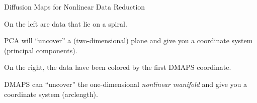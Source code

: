 \documentclass[12pt]{beamer}
\begin{document}
\begin{frame}{Diffusion Maps for Nonlinear Data Reduction}
    

	\vspace{-0.1in}
	{\scriptsize 
	On the left are data that lie on a spiral. 

	PCA will ``uncover'' a (two-dimensional) plane and give you a coordinate system (principal components). 

	On the right, the data have been colored by the first DMAPS coordinate. 

	DMAPS can ``uncover'' the one-dimensional {\em nonlinear manifold} and give you a coordinate system (arclength). \par }

\end{frame}
\end{document}
